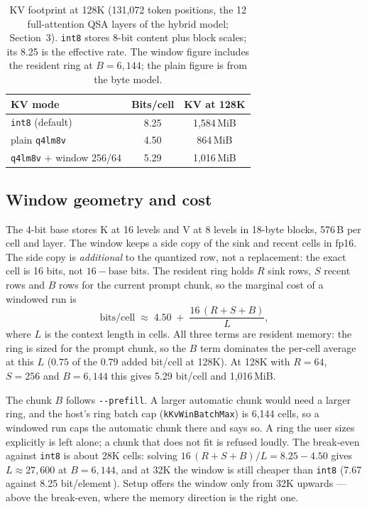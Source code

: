 \documentclass[10pt,twocolumn]{article}
\begin{document}
\begin{table}[t]
\centering
\small
\begin{tabular}{@{}lcc@{}}
\toprule
\textbf{KV mode} & \textbf{Bits/cell} & \textbf{KV at 128K} \\
\midrule
\texttt{int8} (default) & 8.25 & 1,584\,MiB \\
plain \texttt{q4lm8v} & 4.50 & 864\,MiB \\
\texttt{q4lm8v} + window 256/64 & 5.29 & 1,016\,MiB \\
\bottomrule
\end{tabular}
\caption{KV footprint at 128K (131,072 token positions, the 12 full-attention QSA layers of the hybrid model; Section~3). \texttt{int8} stores 8-bit content plus block scales; its 8.25 is the effective rate. The window figure includes the resident ring at $B{=}6{,}144$; the plain figure is from the byte model.}
\label{tab:footprint}
\end{table}

\subsection{Window geometry and cost}

The 4-bit base stores K at 16 levels and V at 8 levels in 18-byte blocks, 576\,B per cell and layer. The window keeps a side copy of the sink and recent cells in fp16. The side copy is \emph{additional} to the quantized row, not a replacement: the exact cell is 16 bits, not $16-\text{base}$ bits. The resident ring holds $R$ sink rows, $S$ recent rows and $B$ rows for the current prompt chunk, so the marginal cost of a windowed run is
\begin{equation}
\text{bits/cell} \;\approx\; 4.50 \;+\; \frac{16\,(R+S+B)}{L},
\end{equation}
where $L$ is the context length in cells. All three terms are resident memory: the ring is sized for the prompt chunk, so the $B$ term dominates the per-cell average at this $L$ ($0.75$ of the $0.79$ added bit/cell at 128K). At 128K with $R{=}64$, $S{=}256$ and $B{=}6{,}144$ this gives 5.29 bit/cell and 1,016\,MiB.

The chunk $B$ follows \texttt{-{}-prefill}. A larger automatic chunk would need a larger ring, and the host's ring batch cap (\texttt{kKvWinBatchMax}) is 6,144 cells, so a windowed run caps the automatic chunk there and says so. A ring the user sizes explicitly is left alone; a chunk that does not fit is refused loudly. The break-even against \texttt{int8} is about 28K cells: solving $16\,(R{+}S{+}B)/L = 8.25 - 4.50$ gives $L \approx 27{,}600$ at $B{=}6{,}144$, and at 32K the window is still cheaper than \texttt{int8} (7.67 against 8.25 bit/element\,\cite{strata-wp}). Setup offers the window only from 32K upwards --- above the break-even, where the memory direction is the right one.
\end{document}
